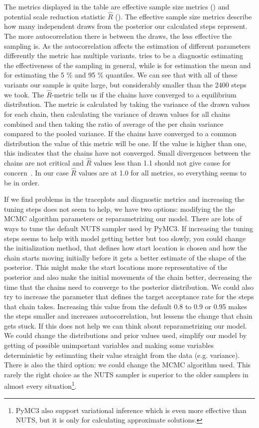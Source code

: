 \documentclass[12pt,a4paper,leqno]{report}
\theoremstyle{plain}
\theoremstyle{definition}
\theoremstyle{remark}
\begin{document}
The metrics displayed in the table are effective sample size metrics ()
and potential scale reduction statistic \(\hat{R}\) (). The effective sample
size metrics describe how many independent draws from the posterior our calculated steps
represent. The more autocorrelation there is between the draws, the less effective the
sampling is. As the autocorrelation affects the estimation of different parameters
differently the metric has multiple variants.  tries to be a
diagnostic estimating the effectiveness of the sampling in general\cite{essbulk},
while  is for estimation the mean and
 for estimating the 5 \% and 95 \% quantiles. We can see that with all
of these variants our sample is quite large, but considerably smaller than the 2400
steps we took. The \(\hat{R}\)-metric
tells us if the chains have converged to a equilibrium distribution. The metric is calculated by
taking the variance of the drawn values for each chain,
then calculating the variance of drawn values for all chains combined and then taking the
ratio of average of the per chain variance compared to the pooled variance. If the
chains have converged to a common distribution the value of this metric will be one. If
the value is higher than one, this indicates that the chains have not converged. Small
divergences between the chains are not critical and \(\hat{R}\) values less than 1.1 should
not give cause for concern\ \cite{rhatrule}. In our case \(\hat{R}\) values are at 1.0 for
all metrics, so everything seems to be in order.

If we find problems in the traceplots and diagnostic metrics and increasing the tuning
steps does not seem to help, we have two options: modifying the
the MCMC algorithm parameters or reparametrizing our
model. There are lots of ways to tune the default NUTS sampler used by PyMC3. If
increasing the tuning steps seems to help with model getting better but too slowly, you
could change the initialization method, that defines how start location is chosen and how
the chain starts moving initially before it gets a better estimate of the shape of the
posterior. This might make the start locations more representative of the posterior and
also make the initial movements of the chain better, decreasing the time that the chains
need to converge to the posterior distribution. We could also try to increase the
parameter  that defines the target acceptance rate for the steps
that chain takes. Increasing this value from the default 0.8 to 0.9 or 0.95 makes the
steps smaller and increases autocorrelation, but lessens the change that chain gets
stuck. If this does not help we
can think about reparametrizing our model. We could change the distributions and prior
values used, simplify our model by getting of possible unimportant variables and making
some variables deterministic by estimating their value straight from the data (e.g.
variance). There is also the third option: we could change the MCMC algorithm used. This
rarely the right choice as the NUTS sampler is superior to the older samplers in almost
every situation\footnote{PyMC3 also support variational
inference which is even more effective than NUTS, but it is only for calculating approximate
solutions.}.
\end{document}
